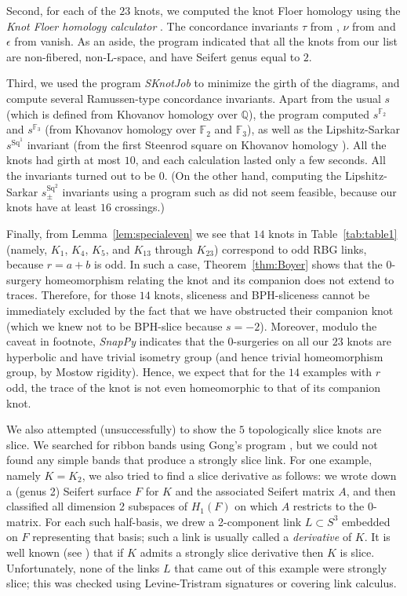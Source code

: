 \documentclass [11pt]{amsart}
\theoremstyle{remark}
\def\Q {{\mathbb{Q}}}
\def\F{\mathbb{F}}
\begin{document}
Second, for each of the $23$ knots, we computed the knot Floer homology using the {\em Knot Floer homology calculator} \cite{HFK}. The concordance invariants $\tau$ from \cite{OStau}, $\nu$ from \cite{RatSurg} and $\epsilon$ from \cite{Hom} vanish. As an aside, the program indicated that all the knots from our list are non-fibered, non-L-space, and have Seifert genus equal to $2$.

Third, we used the program \emph{SKnotJob} \cite{SKnotJob} to minimize the girth of the diagrams, and compute several Ramussen-type concordance invariants. Apart from the usual $s$ (which is defined from Khovanov homology over $\Q$), the program computed $s^{\F_2}$ and $s^{\F_3}$ (from Khovanov homology over $\F_2$ and $\F_3$), as well as the Lipshitz-Sarkar $s^{\operatorname{Sq}^1}$ invariant (from the first Steenrod square on Khovanov homology \cite{LS}). All the knots had girth at most $10$, and each calculation lasted only a few seconds. All the invariants turned out to be $0$. (On the other hand, computing the Lipshitz-Sarkar $s^{\operatorname{Sq}^2}_{\pm}$ invariants using a program such as \cite{SarkarSq} did not seem feasible, because our knots have at least $16$ crossings.)

Finally, from Lemma~\ref{lem:specialeven} we see that $14$ knots in Table~\ref{tab:table1} (namely, $K_1$, $K_4$, $K_5$, and $K_{13}$ through $K_{23}$) correspond to odd RBG links, because $r=a+b$ is odd. In such a case, Theorem~\ref{thm:Boyer} shows that the 0-surgery homeomorphism relating the knot and its companion does not extend to traces. Therefore, for those $14$ knots, sliceness and BPH-sliceness cannot be immediately excluded by the fact that we have obstructed their companion knot (which we knew not to be BPH-slice because $s=-2$). Moreover, modulo the caveat in footnote, {\em SnapPy} indicates that the $0$-surgeries on all our $23$ knots are hyperbolic and have trivial isometry group (and hence trivial homeomorphism group, by Mostow rigidity). Hence, we expect that for the $14$ examples with $r$ odd, the trace of the knot is not even homeomorphic to that of its companion knot.

We also attempted (unsuccessfully) to show the $5$ topologically slice knots are slice. We searched for ribbon bands using Gong's program \cite{Gong}, but we could not found any simple bands that produce a strongly slice link. For one example, namely $K=K_2$, we also tried to find a slice derivative as follows: we wrote down a (genus 2) Seifert surface $F$ for $K$ and the associated Seifert matrix $A$, and then classified all dimension 2 subspaces of $H_1(F)$ on which $A$ restricts to the 0-matrix. For each such half-basis, we drew a 2-component link $L\subset S^3$ embedded on $F$ representing that basis; such a link is usually called a \emph{derivative} of $K$. It is well known (see \cite{Levinealg}) that if $K$ admits a strongly slice derivative then $K$ is slice. Unfortunately, none of the links $L$ that came out of this example were strongly slice; this was checked using Levine-Tristram signatures or covering link calculus.
\end{document}
